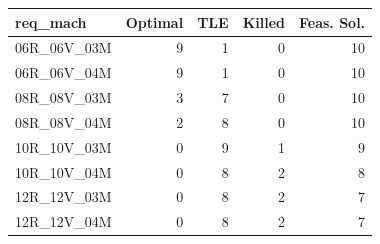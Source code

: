 
\begin{tabular}{lrrrr}
\toprule
req\_mach & Optimal & TLE & Killed & Feas. Sol.\\
\midrule
06R\_06V\_03M & 9 & 1 & 0 & 10\\
06R\_06V\_04M & 9 & 1 & 0 & 10\\
08R\_08V\_03M & 3 & 7 & 0 & 10\\
08R\_08V\_04M & 2 & 8 & 0 & 10\\
10R\_10V\_03M & 0 & 9 & 1 & 9\\
\addlinespace
10R\_10V\_04M & 0 & 8 & 2 & 8\\
12R\_12V\_03M & 0 & 8 & 2 & 7\\
12R\_12V\_04M & 0 & 8 & 2 & 7\\
\bottomrule
\end{tabular}
